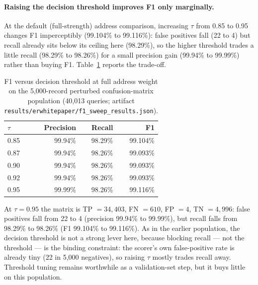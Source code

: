 \documentclass[11pt]{article}
\begin{document}
\paragraph{Raising the decision threshold improves F1 only marginally.}
At the default (full-strength) address comparison, increasing $\tau$ from 0.85 to 0.95 changes F1 imperceptibly (99.104\% to 99.116\%): false positives fall (22 to 4) but recall already sits below its ceiling here (98.29\%), so the higher threshold trades a little recall (98.29\% to 98.26\%) for a small precision gain (99.94\% to 99.99\%) rather than buying F1. Table~\ref{tab:f1-threshold} reports the trade-off.

\begin{table}[h]
\centering
\caption{F1 versus decision threshold at full address weight on the 5,000-record perturbed confusion-matrix population (40,013 queries; artifact \texttt{results/erwhitepaper/f1\_sweep\_results.json}).}
\label{tab:f1-threshold}
\begin{tabular}{lrrr}
\toprule
$\tau$ & Precision & Recall & F1 \\
\midrule
0.85 & 99.94\% & 98.29\% & 99.104\% \\
0.87 & 99.94\% & 98.26\% & 99.093\% \\
0.90 & 99.94\% & 98.26\% & 99.093\% \\
0.92 & 99.94\% & 98.26\% & 99.093\% \\
0.95 & 99.99\% & 98.26\% & 99.116\% \\
\bottomrule
\end{tabular}
\end{table}

At $\tau=0.95$ the matrix is TP \(=34{,}403\), FN \(=610\), FP \(=4\), TN \(=4{,}996\): false positives fall from 22 to 4 (precision 99.94\% to 99.99\%), but recall falls from 98.29\% to 98.26\% (F1 99.104\% to 99.116\%). As in the earlier population, the decision threshold is not a strong lever here, because blocking recall --- not the threshold --- is the binding constraint: the scorer's own false-positive rate is already tiny (22 in 5,000 negatives), so raising $\tau$ mostly trades recall away. Threshold tuning remains worthwhile as a validation-set step, but it buys little on this population.
\end{document}
